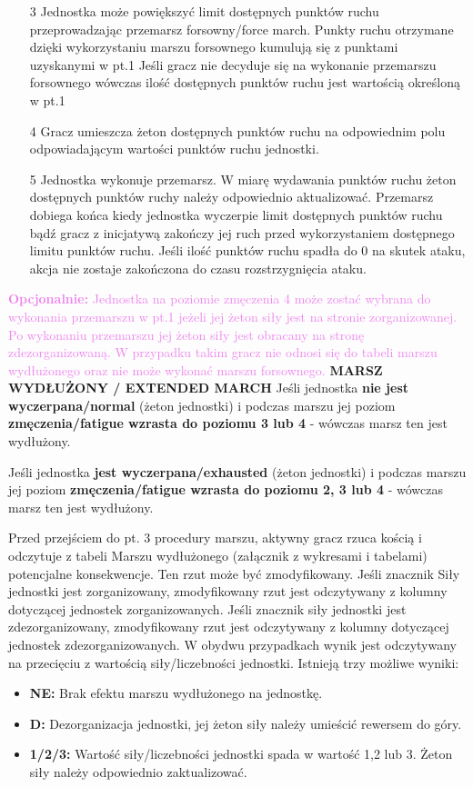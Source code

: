 \begin{itemize}
  \item[3] Jednostka może powiększyć limit dostępnych punktów ruchu przeprowadzając przemarsz forsowny/force march. Punkty ruchu otrzymane dzięki wykorzystaniu marszu forsownego kumulują się z punktami uzyskanymi w pt.1 Jeśli gracz nie decyduje się na wykonanie przemarszu forsownego wówczas ilość dostępnych punktów ruchu jest wartością określoną w pt.1
  \item[4] Gracz umieszcza żeton dostępnych punktów ruchu na odpowiednim polu odpowiadającym wartości punktów ruchu jednostki.
  \item[5] Jednostka wykonuje przemarsz. W miarę wydawania punktów ruchu żeton dostępnych punktów ruchy należy odpowiednio aktualizować. Przemarsz dobiega końca kiedy jednostka wyczerpie limit dostępnych punktów ruchu bądź gracz z inicjatywą zakończy jej ruch przed wykorzystaniem dostępnego limitu punktów ruchu. Jeśli ilość punktów ruchu spadła do 0 na skutek ataku, akcja nie zostaje zakończona do czasu rozstrzygnięcia ataku.
\end{itemize}
\textcolor{violet}{\textbf{Opcjonalnie: }Jednostka na poziomie zmęczenia 4 może zostać wybrana do wykonania przemarszu w pt.1 jeżeli jej żeton siły jest na stronie zorganizowanej. Po wykonaniu przemarszu jej żeton siły jest obracany na stronę zdezorganizowaną. W przypadku takim gracz nie odnosi się do tabeli marszu wydłużonego oraz nie może wykonać marszu forsownego.}
\bigbreak
\textbf{MARSZ WYDŁUŻONY / EXTENDED MARCH}
\bigbreak
Jeśli jednostka \textbf{nie jest wyczerpana/normal} (żeton jednostki) i podczas marszu jej poziom \textbf{zmęczenia/fatigue wzrasta do poziomu 3 lub 4} - wówczas marsz ten jest wydłużony.\par
Jeśli jednostka \textbf{jest wyczerpana/exhausted} (żeton jednostki) i podczas marszu jej poziom \textbf{zmęczenia/fatigue wzrasta do poziomu 2, 3 lub 4} - wówczas marsz ten jest wydłużony.\par
Przed przejściem do pt. 3 procedury marszu, aktywny gracz rzuca kością i odczytuje z tabeli Marszu wydłużonego (załącznik z wykresami i tabelami) potencjalne konsekwencje. Ten rzut może być zmodyfikowany. Jeśli znacznik Siły jednostki jest zorganizowany, zmodyfikowany rzut jest odczytywany z kolumny dotyczącej jednostek zorganizowanych. Jeśli znacznik siły jednostki jest zdezorganizowany, zmodyfikowany rzut jest odczytywany z kolumny dotyczącej jednostek zdezorganizowanych. W obydwu przypadkach wynik jest odczytywany na przecięciu z wartością siły/liczebności jednostki. Istnieją trzy możliwe wyniki:
\begin{itemize}
    \item \textbf{NE:} Brak efektu marszu wydłużonego na jednostkę.
	\item \textbf{D:} Dezorganizacja jednostki, jej żeton siły należy umieścić rewersem do góry.
	\item \textbf{1/2/3:} Wartość siły/liczebności jednostki spada w wartość 1,2 lub 3. Żeton siły należy odpowiednio zaktualizować.
\end{itemize}
